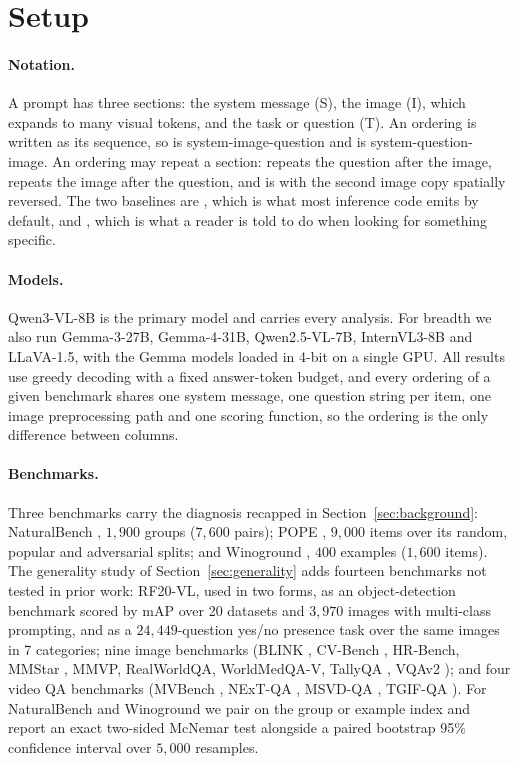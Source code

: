 \section{Setup}
\label{sec:setup}

\paragraph{Notation.} A prompt has three sections: the system message (S), the
image (I), which expands to many visual tokens, and the task or question (T). An
ordering is written as its sequence, so \sit{} is system-image-question and
\sti{} is system-question-image. An ordering may repeat a section: \stit{}
repeats the question after the image, \sitit{} repeats the image after the
question, and \sititrev{} is \sitit{} with the second image copy spatially
reversed. The two baselines are \sit{}, which is what most inference code emits
by default, and \sti{}, which is what a reader is told to do when looking for
something specific.

\paragraph{Models.} Qwen3-VL-8B is the primary model and carries every analysis.
For breadth we also run Gemma-3-27B, Gemma-4-31B, Qwen2.5-VL-7B, InternVL3-8B
and LLaVA-1.5, with the Gemma models loaded in 4-bit on a single GPU. All results
use greedy decoding with a fixed answer-token budget, and every ordering of a
given benchmark shares one system message, one question string per item, one
image preprocessing path and one scoring function, so the ordering is the only
difference between columns.

\paragraph{Benchmarks.} Three benchmarks carry the diagnosis recapped in
Section~\ref{sec:background}: NaturalBench \citep{naturalbench2024},
$1{,}900$ groups ($7{,}600$ pairs); POPE \citep{pope2023}, $9{,}000$ items over
its random, popular and adversarial splits; and Winoground
\citep{winoground2022}, $400$ examples ($1{,}600$ items). The generality study
of Section~\ref{sec:generality} adds fourteen benchmarks not tested in prior
work: RF20-VL, used in two forms, as an object-detection benchmark scored by mAP
over 20 datasets and $3{,}970$ images with multi-class prompting, and as a
$24{,}449$-question yes/no presence task over the same images in 7 categories;
nine image benchmarks (BLINK \citep{blink2024},
CV-Bench \citep{cambrian2024}, HR-Bench, MMStar \citep{mmstar2024}, MMVP,
RealWorldQA, WorldMedQA-V, TallyQA \citep{tallyqa2019}, VQAv2 \citep{vqav2});
and four video QA benchmarks (MVBench \citep{mvbench2024}, NExT-QA
\citep{nextqa2021}, MSVD-QA \citep{msvdqa2017}, TGIF-QA \citep{tgifqa2017}). For
NaturalBench and Winoground we pair on the group or example index and report an
exact two-sided McNemar test alongside a paired bootstrap 95\% confidence
interval over $5{,}000$ resamples.

